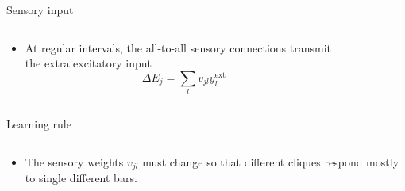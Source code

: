 \documentclass[final,hyperref={pdfpagelabels=false}]{beamer}
\begin{document}
\begin{frame}
\begin{columns}
\begin{column}{.60\textwidth}
\begin{minipage}[T]{.95\textwidth}
{\begin{block}{Sensory input}
\begin{columns}
\begin{column}[T]{.55\textwidth}
\begin{itemize}
							\item At regular intervals, the all-to-all sensory connections transmit the extra excitatory input
								\begin{equation*}
								\Delta E_j = \sum_{l} v_{jl} y_l^{\text{ext}}
								\end{equation*}
						\end{itemize}						
					\end{column}
					\begin{column}[T]{.45\textwidth}	
						\begin{figure}[T]
							
						\end{figure}
					\end{column}
				\end{columns}
			\end{block}
			\vfil
			\begin{minipage}[T]{.55\textwidth}
			\begin{block}{Learning rule}
				
				\begin{columns}
					\begin{column}[T]{1\textwidth}
						\begin{itemize}
							\item The sensory weights $v_{jl}$ must change so that different cliques respond mostly to single different bars.
							

\end{itemize}
\end{column}
\end{columns}
\end{block}
\end{minipage}}
\end{minipage}
\end{column}
\end{columns}
\end{frame}
\end{document}

